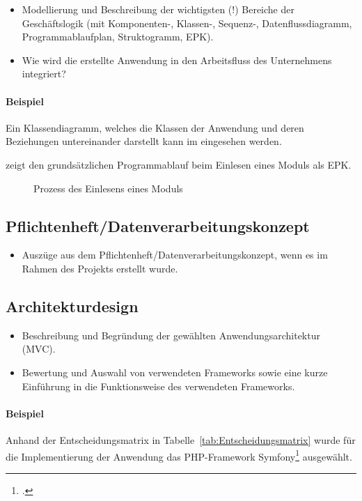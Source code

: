 \begin{itemize}
	\item Modellierung und Beschreibung der wichtigsten (!) Bereiche der Geschäftslogik (\zB mit Kom\-po\-nen\-ten-, Klassen-, Sequenz-, Datenflussdiagramm, Programmablaufplan, Struktogramm, \ac{EPK}).
	\item Wie wird die erstellte Anwendung in den Arbeitsfluss des Unternehmens integriert?
\end{itemize}

\paragraph{Beispiel}
Ein Klassendiagramm, welches die Klassen der Anwendung und deren Beziehungen untereinander darstellt kann im  eingesehen werden.

 zeigt den grundsätzlichen Programmablauf beim Einlesen eines Moduls als \ac{EPK}.
\begin{figure}[htb]
	\centering
	\caption{Prozess des Einlesens eines Moduls}
	\label{fig:Modulimport}
\end{figure}

\subsection{Pflichtenheft/Datenverarbeitungskonzept}
\label{sec:Pflichtenheft}
\begin{itemize}
	\item Auszüge aus dem Pflichtenheft/Datenverarbeitungskonzept, wenn es im Rahmen des Projekts erstellt wurde.
\end{itemize}

\subsection{Architekturdesign}
\label{sec:Architekturdesign}
\begin{itemize}
	\item Beschreibung und Begründung der gewählten Anwendungsarchitektur (\zB \acs{MVC}).
	\item \Ggfs Bewertung und Auswahl von verwendeten Frameworks sowie \ggfs eine kurze Einführung in die Funktionsweise des verwendeten Frameworks.
\end{itemize}

\paragraph{Beispiel}
Anhand der Entscheidungsmatrix in Tabelle~\ref{tab:Entscheidungsmatrix} wurde für die Implementierung der Anwendung das \acs{PHP}-Framework Symfony\footnote{\Vgl \citet{Symfony}.} ausgewählt. 



